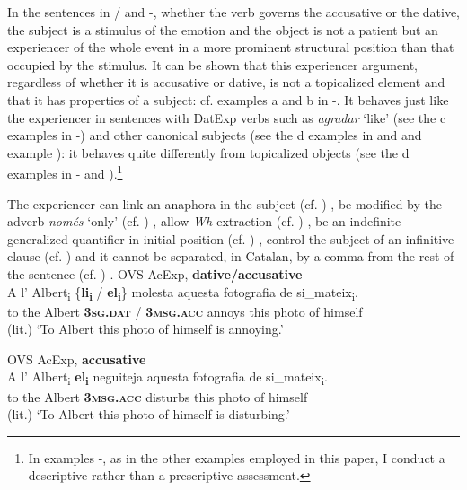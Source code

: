 \documentclass[output=paper,colorlinks,citecolor=brown,modfonts,nonflat]{langsci/langscibook}
\begin{document}
In the sentences in / and -, whether the verb governs the accusative or the dative, the subject is a stimulus of the emotion and the object is not a patient but an experiencer of the whole event in a more prominent structural position than that occupied by the stimulus. It can be shown that this experiencer argument, regardless of whether it is accusative or dative, is not a topicalized element and that it has properties of a subject: cf. examples {a} and {b} in -. It behaves just like the experiencer in sentences with DatExp verbs such as \textit{agradar} ‘like’ (see the {c} examples in -) and other canonical subjects (see the {d} examples in  and  and example ): it behaves quite differently from topicalized objects (see the {d} examples in - and ).\footnote{In examples -, as in the other examples employed in this paper, I conduct a descriptive rather than a prescriptive assessment.}

The experiencer can link an anaphora in the subject (cf. \citealt{Demonte1989, EgurenFernándezSoriano2004}) , be modified by the adverb \textit{només} ‘only’ (cf. \citealt{Cuervo1999}) , allow \textit{Wh-}extraction (cf. \citealt{BellettiRizzi1988}) , be an indefinite generalized quantifier in initial position (cf. \citealt{BellettiRizzi1988, Masullo1992quirky, Cuervo1999}) , control the subject of an infinitive clause (cf. \citealt{Campos1999, Alsina2008})  and it cannot be separated, in Catalan, by a comma from the rest of the sentence (cf. \citealt{Ginebra2003, Ginebra2005}) .
\textbf{}
\ea%
 \label{ex:royo:8}
 \ea OVS AcExp, \textbf{dative/accusative} \label{ex:royo:8a}\\
 \gll A l’ Albert\textsubscript{i} \{\textbf{li\textsubscript{i}} / \textbf{el\textsubscript{i}}\} molesta aquesta fotografia de si\_mateix\textsubscript{i}.\\
 to the Albert \textbf{\textsc{3sg.dat}} / \textbf{\textsc{3msg.acc}} annoys this photo       of himself\\
\glt (lit.) ‘To Albert this photo of himself is annoying.’


 \ex OVS AcExp, \textbf{accusative}\label{ex:royo:8b}\\
 \gll A l’ Albert\textsubscript{i} \textbf{el\textsubscript{i}} neguiteja aquesta fotografia de si\_mateix\textsubscript{i}.\\
 to the Albert \textbf{\textsc{3msg.acc} } disturbs this photo of himself\\
\glt (lit.) ‘To Albert this photo of himself is disturbing.’
\end{document}

